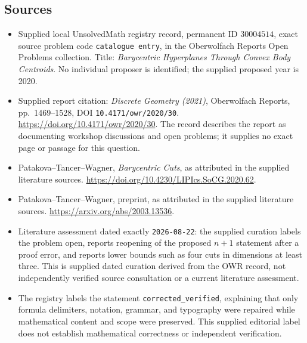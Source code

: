 \documentclass[11pt]{article}
\begin{document}
\subsection{Sources}
\begin{itemize}
\item Supplied local UnsolvedMath registry record, permanent ID \(30004514\), exact source problem code \texttt{catalogue entry}, in the Oberwolfach Reports Open Problems collection. Title: \emph{Barycentric Hyperplanes Through Convex Body Centroids}. No individual proposer is identified; the supplied proposed year is 2020.
\item Supplied report citation: \emph{Discrete Geometry (2021)}, Oberwolfach Reports, pp.\ 1469--1528, DOI \texttt{10.4171/owr/2020/30}. \url{https://doi.org/10.4171/owr/2020/30}. The record describes the report as documenting workshop discussions and open problems; it supplies no exact page or passage for this question.
\item Patakova--Tancer--Wagner, \emph{Barycentric Cuts}, as attributed in the supplied literature sources. \url{https://doi.org/10.4230/LIPIcs.SoCG.2020.62}.
\item Patakova--Tancer--Wagner, preprint, as attributed in the supplied literature sources. \url{https://arxiv.org/abs/2003.13536}.
\item Literature assessment dated exactly \texttt{2026-08-22}: the supplied curation labels the problem open, reports reopening of the proposed \(n+1\) statement after a proof error, and reports lower bounds such as four cuts in dimensions at least three. This is supplied dated curation derived from the OWR record, not independently verified source consultation or a current literature assessment.
\item The registry labels the statement \texttt{corrected\_verified}, explaining that only formula delimiters, notation, grammar, and typography were repaired while mathematical content and scope were preserved. This supplied editorial label does not establish mathematical correctness or independent verification.
\end{itemize}
\end{document}
